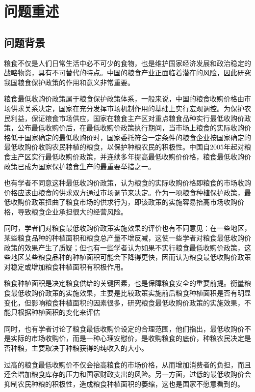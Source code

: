 \documentclass[withoutpreface,bwprint]{cumcmthesis} %
\begin{document}
	\section{问题重述}
	\subsection{问题背景}
粮食不仅是人们日常生活中必不可少的食物，也是维护国家经济发展和政治稳定的战略物资，具有不可替代的特点。中国的粮食产业正面临着潜在的风险，因此研究我国粮食保护政策的作用和意义非常重要。\par
粮食最低收购价政策属于粮食保护政策体系，一般来说，中国的粮食收购价格由市场供求关系决定，国家在充分发挥市场机制作用的基础上实行宏观调控。为保护农民利益，保证粮食市场供应，国家在粮食主产区对重点粮食品种实行最低收购价政策，公布最低收购价后，在最低收购价政策执行期间，当市场上粮食的实际收购价格低于国家确定的最低收购价时，国家委托符合一定条件的粮食企业按国家确定的最低收购价收购农民种植的粮食，以保护种粮农民的积极性。中国自2005年起对粮食主产区实行最低收购价政策，并连续多年提高最低收购价价格，粮食最低收购价政策已成为国家保护粮食生产的最重要举措之一。\par
也有学者不同意这种最低收购价政策，认为粮食的实际收购价格即粮食的市场收购价格应该由粮食的供求双方通过市场调节来决定。作为一项粮食种植保护政策，最低收购价政策扭曲了粮食市场的供求行为，即该政策的实施容易抬高市场收购价格，导致粮食企业承担很大的经营风险。\par
同时，学者们对粮食最低收购价政策实施效果的评价也有不同意见：在一些地区，某些粮食品种的种植面积和粮食总产量不增反减，这使一些学者对粮食最低收购价政策的效果产生了质疑；但也有一些学者认为如果不实行粮食最低收购价政策，这些地区某些粮食品种的种植面积可能会下降得更快，因而认为粮食最低收购价政策对稳定或增加粮食种植面积有积极作用。\par
粮食种植面积是决定粮食供给的关键因素，也是保障粮食安全的重要前提。衡量粮食最低收购价政策的实施效果，主要是比较政策实施前后粮食种植面积是否有明显变化，但影响粮食种植面积的因素很多，研究粮食最低收购价政策的实施效果，不能只根据种植面积的变化来评估\par
同时，也有学者讨论了粮食最低收购价设定的合理范围，他们指出，最低收购价不是实际的市场收购价，而是一种心理安慰价，是收购粮食的底价，种粮农民决定是否种粮，主要取决于种粮获得的纯收入的大小。\par
过高的粮食最低收购价不仅会抬高粮食的市场价格，从而增加消费者的负担，而且还会增加粮食库存的压力和国家财政支出的风险。另一方面，过低的最低收购价会抑制农民种粮的积极性，造成粮食种植面积的萎缩，这也是国家不愿意看到的。
\end{document}
